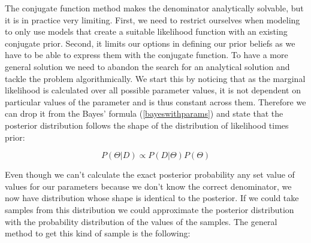 \documentclass[12pt,a4paper,leqno]{report}
\theoremstyle{plain}
\theoremstyle{definition}
\theoremstyle{remark}
\begin{document}
The conjugate function method makes the denominator analytically solvable, but it
is in practice very limiting. First, we need to restrict ourselves when
modeling to only use models that create a suitable likelihood function with an existing conjugate prior. Second, it limits our options in defining our prior
beliefs as we have to be able to express them with the conjugate function. To
have a more general solution we need to abandon the search for an analytical
solution and tackle the problem algorithmically. We start this by noticing that
as the marginal likelihood is calculated over all possible parameter values, it is
not dependent on particular values of the parameter and is thus constant across
them. Therefore we can drop it from the Bayes' formula (\ref{bayeswithparams}) and state that the posterior
distribution follows the shape of the distribution of likelihood times prior:

\begin{def}\label{bayespropto}
    \begin{equation}
        P(\Theta|D) \propto P(D|\Theta)P(\Theta)
    \end{equation}
\end{def}

Even though we can't calculate the exact posterior probability any set value of
values for our parameters because we don't know the correct denominator, we now
have distribution whose shape is identical to the posterior. If we could take
samples from this distribution we could approximate the posterior distribution
with the probability distribution of the values of the samples. The general
method to get this kind of sample is the following:

\end{document}
